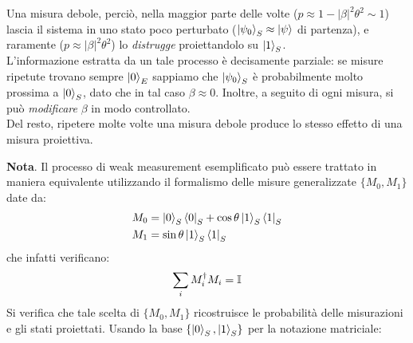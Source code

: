 \documentclass[../../InformazioneQuantistica.tex]{subfiles}
\begin{document}
Una misura debole, perciò,  nella maggior parte delle volte ($p\approx 1-|\beta|^2 \theta^2 \sim 1$) lascia il sistema in uno stato poco perturbato ($\Ket{\psi_0}_S \approx \Ket{\psi}$ di partenza), e raramente ($p\approx |\beta|^2 \theta^2$) lo \textit{distrugge} proiettandolo su $\Ket{1}_S$.\\
L'informazione estratta da un tale processo è decisamente parziale: se misure ripetute trovano sempre $\Ket{0}_E$ sappiamo che $\Ket{\psi_0}_S$ è probabilmente molto prossima a $\Ket{0}_S$, dato che in tal caso $\beta \approx 0$. Inoltre, a seguito di ogni misura, si può \textit{modificare} $\beta$ in modo controllato.\\
Del resto, ripetere molte volte una misura debole produce lo stesso effetto di una misura proiettiva.


\textbf{Nota}. Il processo di weak measurement esemplificato può essere trattato in maniera equivalente utilizzando il formalismo delle misure generalizzate $\{M_0, M_1\}$ date da:
\begin{align*}
M_0 &= \Ket{0}_S\Bra{0}_S + \cos\theta \Ket{1}_S\Bra{1}_S\\
M_1 &= \sin\theta \Ket{1}_S\Bra{1}_S
\end{align*}
che infatti verificano:
\begin{align*}
\sum_i M_i^\dag M_i = \mathbb{I}
\end{align*}
Si verifica che tale scelta di $\{M_0, M_1\}$ ricostruisce le probabilità delle misurazioni e gli stati proiettati. Usando la base $\{\Ket{0}_S, \Ket{1}_S\}$ per la notazione matriciale:
\end{document}
